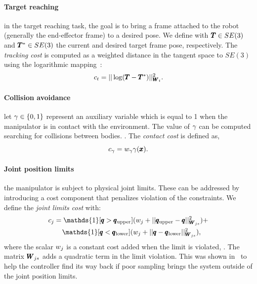 \paragraph{Target reaching} in the target reaching task, the goal is to bring a frame attached to the robot (generally the end-effector frame) to a desired pose. We define with $\pmb{T} \in SE(3)$ and $\pmb{T}^* \in SE(3)$ the current and desired target frame pose, respectively. The \textit{tracking cost} is computed as a weighted distance in the tangent space to $SE(3)$ using the logarithmic mapping~\cite{blanco2010tutorial}:
\begin{equation} \label{eq:tracking_cost}
     c_{t} = || \log(\pmb{T} - \pmb{T}^{*}) ||^2_{\pmb{W}_{t}}.
 \end{equation}
 
 \paragraph{Collision avoidance} let $\gamma \in \{0, 1\}$ represent an auxiliary variable which is equal to 1 when the manipulator is in contact with the environment. The value of $\gamma$ can be computed searching for collisions between bodies. 
 . 
 The \textit{contact cost} is defined as,
 \begin{equation}
     c_{\gamma}= w_{\gamma} \gamma(\pmb{x}).
 \end{equation}

 \paragraph{Joint position limits} the manipulator is subject to physical joint limits. These can be addressed by introducing a cost component that penalizes violation of the constraints. We define the \textit{joint limits cost} with:
 \begin{align}
     &c_{j} = \mathds{1}[\configRobot > \upperLimits](\weightScalar{j} + ||\upperLimits - \configRobot||^2_{\weightMatrix{js}}) + \nonumber\\ 
     &\qquad\mathds{1}[\configRobot < \lowerLimits](\weightScalar{j} +  || \configRobot - \lowerLimits||^2_{\weightMatrix{js}}), 
 \end{align}
 where the scalar $w_{j}$ is a constant cost added when the limit is violated, . The matrix $\pmb{W}_{js}$ adds a quadratic term in the limit violation. This was shown in~\cite{williams_information-theoretic_2018} to help the controller find its way back if poor sampling brings the system outside of the joint position limits.
 
